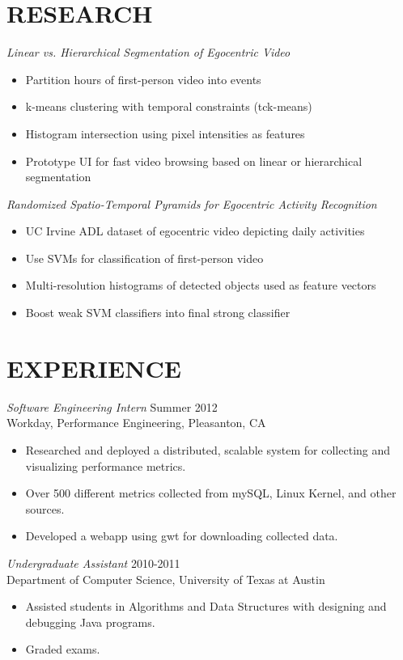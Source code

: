 \documentclass[line,margin]{res}
\begin{document}
\begin{resume}
\section{RESEARCH} {\sl Linear vs. Hierarchical Segmentation of Egocentric Video} 
	\begin{itemize} \itemsep -2pt
	\item Partition hours of first-person video into events 
	\item k-means clustering with temporal constraints (tck-means)
	\item Histogram intersection using pixel intensities as features
	\item Prototype UI for fast video browsing based on linear or hierarchical segmentation
	\end{itemize}
 {\sl Randomized Spatio-Temporal Pyramids for Egocentric Activity Recognition}
	\begin{itemize} \itemsep -2pt
	\item UC Irvine ADL dataset of egocentric video depicting daily activities
	\item Use SVMs for classification of first-person video
	\item Multi-resolution histograms of detected objects used as feature vectors
	\item Boost weak SVM classifiers into final strong classifier 
	\end{itemize}

\section{EXPERIENCE} {\sl Software Engineering Intern} \hfill Summer 2012 \\
                Workday, 
                Performance Engineering, Pleasanton, CA
                 \begin{itemize}  \itemsep -2pt %
                 \item Researched and deployed a distributed, scalable system for collecting and visualizing performance metrics.
								 \item Over 500 different metrics collected from mySQL, Linux Kernel, and other sources.
                 \item Developed a webapp using gwt for downloading collected data.
                \end{itemize}
 
                {\sl Undergraduate Assistant} \hfill        2010-2011 \\
                Department of Computer Science, University of Texas at Austin
                  \begin{itemize}
                   \item Assisted students in Algorithms and Data Structures with designing and debugging Java programs.
									 \item Graded exams.
                   \end{itemize} 
 


\end{resume}
\end{document}
